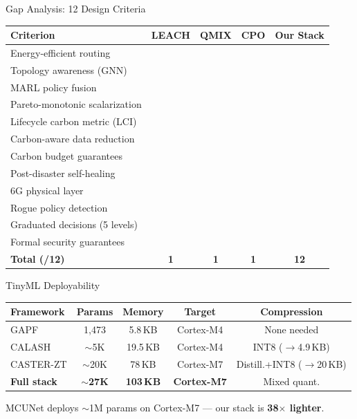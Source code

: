 \documentclass[final]{beamer}
\newlength{\colwidth}
\newcommand{\cmark}{\ding{51}}
\begin{document}
\begin{frame}[t]
\begin{columns}[t]
\begin{column}{\colwidth}
  \begin{block}{Gap Analysis: 12 Design Criteria}
    \footnotesize
    \begin{table}
      \centering
      \renewcommand{\arraystretch}{1.05}
      \begin{tabular}{l|cccc}
        \toprule
        \textbf{Criterion} & \textbf{LEACH} & \textbf{QMIX} & \textbf{CPO} & \textbf{Our Stack} \\
        \midrule
        Energy-efficient routing & \cmark & \cmark & & \cmark \\
        Topology awareness (GNN) & & & & \cmark \\
        MARL policy fusion & & & & \cmark \\
        Pareto-monotonic scalarization & & & & \cmark \\
        Lifecycle carbon metric (LCI) & & & & \cmark \\
        Carbon-aware data reduction & & & & \cmark \\
        Carbon budget guarantees & & & & \cmark \\
        Post-disaster self-healing & & & & \cmark \\
        6G physical layer & & & & \cmark \\
        Rogue policy detection & & & \cmark & \cmark \\
        Graduated decisions (5 levels) & & & & \cmark \\
        Formal security guarantees & & & & \cmark \\
        \midrule
        \textbf{Total (/12)} & \textbf{1} & \textbf{1} & \textbf{1} & \textbf{12} \\
        \bottomrule
      \end{tabular}
    \end{table}
  \end{block}

  \begin{block}{TinyML Deployability}
    \footnotesize
    \begin{table}
      \centering
      \renewcommand{\arraystretch}{1.1}
      \begin{tabular}{lcccc}
        \toprule
        \textbf{Framework} & \textbf{Params} & \textbf{Memory} & \textbf{Target} & \textbf{Compression} \\
        \midrule
        GAPF & 1,473 & 5.8\,KB & Cortex-M4 & None needed \\
        CALASH & $\sim$5K & 19.5\,KB & Cortex-M4 & INT8 ($\to$4.9\,KB) \\
        CASTER-ZT & $\sim$20K & 78\,KB & Cortex-M7 & Distill.+INT8 ($\to$20\,KB) \\
        \midrule
        \textbf{Full stack} & $\sim$\textbf{27K} & \textbf{103\,KB} & \textbf{Cortex-M7} & Mixed quant. \\
        \bottomrule
      \end{tabular}
    \end{table}
    \normalsize
    MCUNet deploys $\sim$1M params on Cortex-M7 --- our stack is \textbf{38$\times$ lighter}.
  \end{block}


\end{column}
\end{columns}
\end{frame}
\end{document}
